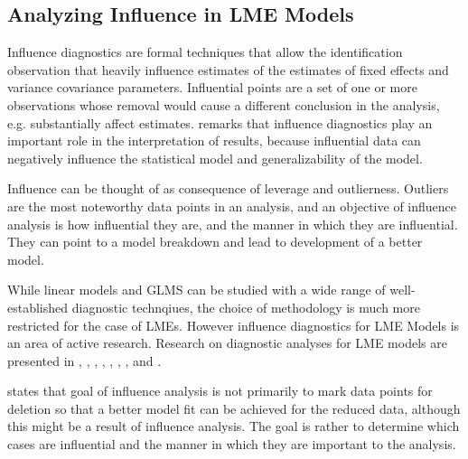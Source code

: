 \documentclass[12pt, a4paper]{report}
\theoremstyle{definition}
\theoremstyle{remark}
\begin{document}
\subsection{Analyzing Influence in LME Models}

Influence diagnostics are formal techniques that allow the identification observation that heavily influence estimates of the estimates of fixed effects and variance covariance parameters.
Influential points are a set of one or more observations whose removal would cause a different conclusion in the analysis, e.g. substantially affect estimates. \citet{west} remarks that influence diagnostics play an important role in the interpretation of results, because influential data can negatively influence the statistical model and generalizability of the model.









Influence can be thought of as consequence of leverage and outlierness. Outliers are the most noteworthy data points in an analysis, and an objective of influence analysis is how influential they are, and the manner in which they are influential. They can point to a model breakdown and lead to development of a better model.

While linear models and GLMS can be studied with a wide range of well-established diagnostic technqiues, the choice of methodology is much more restricted for the case of LMEs. However
influence diagnostics for LME Models is an area of active research. Research on diagnostic analyses for LME models are presented in \citet{Beckman}, 
\citet{Christensen}, \citet{Hilden95}, \citet{lesaffre1998local}, \citet{Banerjee1997}, 
\citet{fung2002}, \citet{Demi}, \citet{Zewotir} and \citet{NobreSinger2007, NobreSinger2011}.





\citet{schabenberger} states that goal of influence analysis is not primarily to mark data
points for deletion so that a better model fit can be achieved for the reduced data, although this might be a
result of influence analysis. The goal is rather to determine which cases are influential and the manner in
which they are important to the analysis. 
\end{document}

